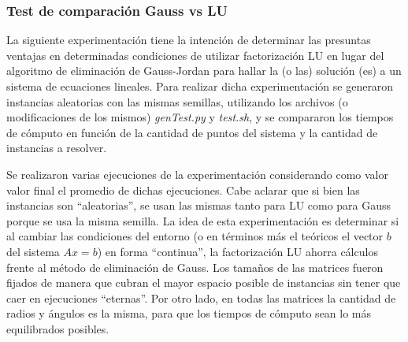 \subsubsection{Test de comparación Gauss vs LU}
La siguiente experimentación tiene la intención de determinar las presuntas ventajas en determinadas condiciones de utilizar factorización LU en lugar del algoritmo de eliminación de Gauss-Jordan para hallar la (o las) solución (es) a un sistema de ecuaciones lineales. Para realizar dicha experimentación se generaron instancias aleatorias con las mismas semillas, utilizando los archivos (o modificaciones de los mismos) \emph{genTest.py} y \emph{test.sh}, y se compararon los tiempos de cómputo en función de la cantidad de puntos del sistema y la cantidad de instancias a resolver. 

Se realizaron varias ejecuciones de la experimentación considerando como valor valor final el promedio de dichas ejecuciones. Cabe aclarar que si bien las instancias son ``aleatorias'', se usan las mismas tanto para LU como para Gauss porque se usa la misma semilla. La idea de esta experimentación es determinar si al cambiar las condiciones del entorno (o en términos más el teóricos el vector $b$ del sistema $Ax=b$) en forma ``continua'', la factorización LU ahorra cálculos frente al método de eliminación de Gauss. Los tamaños de las matrices fueron fijados de manera que cubran el mayor espacio posible de instancias sin tener que caer en ejecuciones ``eternas''. Por otro lado, en todas las matrices la cantidad de radios y ángulos es la misma, para que los tiempos de cómputo sean lo más equilibrados posibles.

